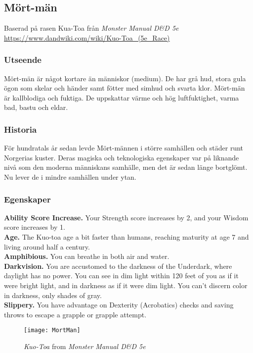 \subsection*{Mört-män}
Baserad på rasen Kua-Toa från \textit{Monster Manual D\&D 5e\cite{MonsterManual}} \\
\url{https://www.dandwiki.com/wiki/Kuo-Toa_(5e_Race)}
%
\subsubsection*{Utseende}
Mört-män är något kortare än människor (medium). De har grå hud, stora gula ögon som skelar och händer samt fötter med simhud och svarta klor. Mört-män är kallblodiga och fuktiga. De uppskattar värme och hög luftfuktighet, varma bad, bastu och eldar.
%
\subsubsection*{Historia}
För hundratals år sedan levde Mört-männen i större samhällen och städer runt Norgerias kuster. Deras magiska och teknologiska egenskaper var på liknande nivå som den moderna människans samhälle, men det är sedan länge bortglömt. Nu lever de i mindre samhällen under ytan.
%
\subsubsection*{Egenskaper}
\textbf{Ability Score Increase.} Your Strength score increases by 2, and your Wisdom score increases by 1. \\
\textbf{Age.} The Kuo-toa age a bit faster than humans, reaching maturity at age 7 and living around half a century. \\
\textbf{Amphibious.} You can breathe in both air and water. \\
\textbf{Darkvision.} You are accustomed to the darkness of the Underdark, where daylight has no power. You can see in dim light within 120 feet of you as if it were bright light, and in darkness 
as if it were dim light. You can't discern color in darkness, only shades of gray. \\
\textbf{Slippery.} You have advantage on Dexterity (Acrobatics) checks and saving throws to escape a grapple or grapple attempt. \\

\begin{figure}
	\centering
	\texttt{[image: MortMan]}
	\caption{\textit{Kuo-Toa} from \textit{Monster Manual D\&D 5e}\cite{MonsterManual}}
\end{figure}